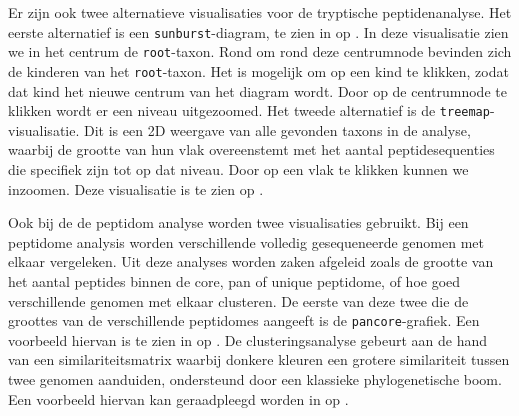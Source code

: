 Er zijn ook twee alternatieve visualisaties voor de tryptische peptidenanalyse.
Het eerste alternatief is een \texttt{sunburst}-diagram, te zien in
 op . In deze visualisatie zien we
in het centrum de \texttt{root}-taxon. Rond om rond deze centrumnode bevinden
zich de kinderen van het \texttt{root}-taxon. Het is mogelijk om op een kind te
klikken, zodat dat kind het nieuwe centrum van het diagram wordt. Door op de
centrumnode te klikken wordt er een niveau uitgezoomed. Het tweede alternatief
is de \texttt{treemap}-visualisatie. Dit is een 2D weergave van alle gevonden
taxons in de analyse, waarbij de grootte van hun vlak overeenstemt met het
aantal peptidesequenties die specifiek zijn tot op dat niveau. Door op een vlak
te klikken kunnen we inzoomen. Deze visualisatie is te zien op
.

Ook bij de de peptidom analyse worden twee visualisaties gebruikt. Bij een 
peptidome analysis worden verschillende volledig gesequeneerde
genomen met elkaar vergeleken. Uit deze analyses worden zaken afgeleid zoals
de grootte van het aantal peptides binnen de core, pan of unique peptidome, of
hoe goed verschillende genomen met elkaar clusteren. De eerste van deze twee die
de groottes van de verschillende peptidomes aangeeft is de
\texttt{pancore}-grafiek. Een voorbeeld hiervan is te zien in
 op . De clusteringsanalyse
gebeurt aan de hand van een similariteitsmatrix waarbij donkere kleuren een
grotere similariteit tussen twee genomen aanduiden, ondersteund door een
klassieke phylogenetische boom. Een voorbeeld hiervan kan geraadpleegd worden in
 op .


